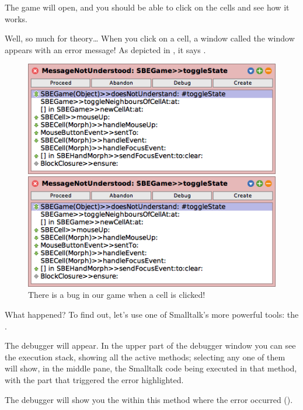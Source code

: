 \documentclass[a4paper,10pt,twoside]{book}
\begin{document}

The game will open, and you should be able to click on the cells and see how it works.

Well, so much for theory\ldots{}
When you click on a cell, a  window called the window appears with an error message!
As depicted in , it says .

\begin{figure}[ht]
\ifluluelse
	{\centerline{\includegraphics[width=\textwidth]{Error}}}
	{\centerline{\includegraphics[scale=0.7]{Error}}}
\caption{There is a bug in our game when a cell is clicked!
\label{fig:quintoError}}
\end{figure}

\noindent
What happened? To find out, let's use one of Smalltalk's more powerful tools: the .

The debugger will appear.
In the upper part of the debugger window you can see the execution stack, showing all the active methods; selecting any one of them will show, in the middle pane, the Smalltalk code being executed in that method, with the part that triggered the error highlighted.

The debugger will show you the  within this method where the error occurred ().
\end{document}
